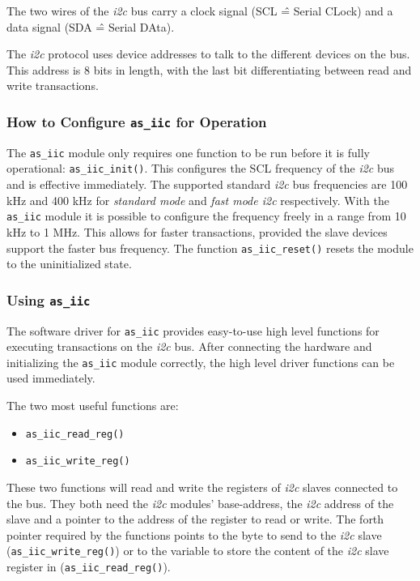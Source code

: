 The two wires of the \textit{i2c} bus carry a clock signal (SCL \^= Serial CLock) and a data signal (SDA \^= Serial DAta).

The \textit{i2c} protocol uses device addresses to talk to the different devices on the bus. This address is 8 bits in length, with the last bit differentiating between read and write transactions.

\subsubsection{How to Configure \texttt{as\_iic} for Operation}

The \texttt{as\_iic} module only requires one function to be run before it is fully operational: \texttt{as\_iic\_init()}.
This configures the SCL frequency of the \textit{i2c} bus and is effective immediately.
The supported standard \textit{i2c} bus frequencies are 100 kHz and 400 kHz for \textit{standard mode} and \textit{fast mode i2c} respectively. With the \texttt{as\_iic} module it is possible to configure the frequency freely in a range from 10 kHz to 1 MHz.
This allows for faster transactions, provided the slave devices support the faster bus frequency. 
The function \texttt{as\_iic\_reset()} resets the module to the uninitialized state.

\subsubsection{Using \texttt{as\_iic}}

The software driver for \texttt{as\_iic} provides easy-to-use high level functions for executing transactions on the \textit{i2c} bus.
After connecting the hardware and initializing the \texttt{as\_iic} module correctly, the high level driver functions can be used immediately.

The two most useful functions are:

\begin{itemize}
    \item \texttt{as\_iic\_read\_reg()}
    \item \texttt{as\_iic\_write\_reg()}
\end{itemize}

These two functions will read and write the registers of \textit{i2c} slaves connected to the bus.
They both need the \textit{i2c} modules' base-address, the \textit{i2c} address of the slave and a pointer to the address of the register to read or write.
The forth pointer required by the functions points to the byte to send to the \textit{i2c} slave (\texttt{as\_iic\_write\_reg()}) or to the variable to store the content of the \textit{i2c} slave register in (\texttt{as\_iic\_read\_reg()}).

